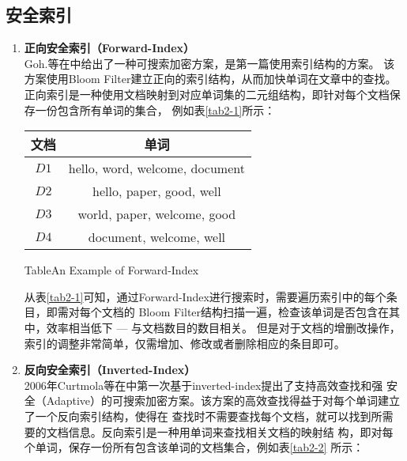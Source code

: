 \subsection{\textbf{安全索引}}
\label{sec:search_symm_secure_index}
\begin{enumerate}
  \item \textbf{正向安全索引（Forward-Index）}\\
  Goh.等在\cite{goh2003secure}中给出了一种可搜索加密方案，是第一篇使用索引结构的方案。
  该方案使用Bloom Filter\cite{gremillion1982designing}建立正向的索引结构，从而加快单词在文章中的查找。
  正向索引是一种使用文档映射到对应单词集的二元组结构，即针对每个文档保存一份包含所有单词的集合，
  例如表\ref{tab2-1}所示：

  \begin{table}[!hbt]
  \centering
  \begin{tabular}[t]{|c|c|}
  \hline
    文档 &       单词 \\
    \hline
    $D1$ & hello, word, welcome, document \\
    \hline
    $D2$ & hello, paper, good, well \\
    \hline
    $D3$ & world, paper, welcome, good \\
    \hline
    $D4$ & document, welcome, well  \\
    \hline
  \end{tabular}
   {Table}{An Example of Forward-Index}
  \end{table}

  从表\ref{tab2-1}可知，通过Forward-Index进行搜索时，需要遍历索引中的每个条目，即需对每个文档的
  Bloom Filter结构扫描一遍，检查该单词是否包含在其中，效率相当低下 --- 与文档数目的数目相关。
  但是对于文档的增删改操作，索引的调整非常简单，仅需增加、修改或者删除相应的条目即可。



  \item \textbf{反向安全索引（Inverted-Index）}\\
  2006年Curtmola等在\cite{curtmola2006searchable}中第一次基于inverted-index提出了支持高效查找和强
  安全（Adaptive）的可搜索加密方案。该方案的高效查找得益于对每个单词建立了一个反向索引结构，使得在
  查找时不需要查找每个文档，就可以找到所需要的文档信息。反向索引是一种用单词来查找相关文档的映射结
  构，即对每个单词，保存一份所有包含该单词的文档集合，例如表\ref{tab2-2} 所示：


\end{enumerate}
